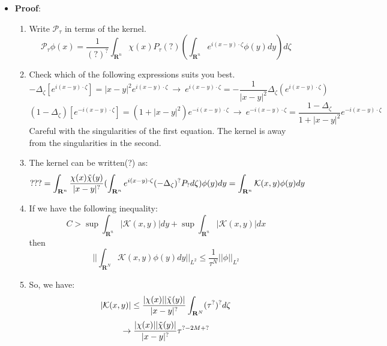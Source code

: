 \documentclass{article}
\begin{document}
\begin{itemize}
    \item \textbf{Proof}:
    \begin{enumerate}
        \item Write $\mathcal{P}_\tau$ in terms of the kernel.
        \begin{equation}
            \mathcal{P}_\tau \phi (x) = \frac{1}{(?)^?} \int_{\mathbf{R}^n} \chi (x) P_\tau (?)(\int_{\mathbf{R}^n}  e^{i (x -y)\cdot \zeta} \phi (y) dy) d\zeta
        \end{equation}

        \item Check which of the following expressions suits you best.
        \begin{equation}
            - \Delta_\zeta [e^{i(x -y) \cdot \zeta}] = |x - y|^2 e^{i(x -y) \cdot \zeta} \ \rightarrow \ e^{i(x -y) \cdot \zeta} = -\frac{1}{|x - y |^2} \Delta_\zeta (e^{i(x -y) \cdot \zeta})
        \end{equation}
        \begin{equation}
            (1 - \Delta_\zeta)[e^{-i(x -y) \cdot \zeta}] = (1+|x-y|^2) e^{-i(x -y) \cdot \zeta} \ \rightarrow \ e^{-i(x -y) \cdot \zeta} =  \frac{1  - \Delta_\zeta}{1 + |x - y|^2} e^{-i(x -y) \cdot \zeta}
        \end{equation}
        Careful with the singularities of the first equation. The kernel is away from the singularities in the second.

        \item The kernel can be written(?) as:
        \begin{equation}
            ??? = \int_{\mathbf{R}^n} \frac{\chi(x) \Tilde{\chi}(y)}{|x - y |^?} (\int_{\mathbf{R}^n} e^{i(x-y) \cdot \zeta} (- \Delta_\zeta)^? P_? d\zeta )\phi(y) dy = \int_{\mathbf{R}^n} \mathcal{K} (x, y) \phi (y) dy
        \end{equation}

        \item If we have the following inequality:
        \begin{equation}
            C > \sup \int_{\mathbf{R}^n}  | \mathcal{K} (x, y)| dy + \sup \int_{\mathbf{R}^n} | \mathcal{K} (x, y)| dx
        \end{equation}
        then
        \begin{equation}
            || \int_{\mathbf{R}^N} \mathcal{K} (x, y)\phi(y) dy||_{L^2} \leq \frac{1}{\tau^N} ||\phi||_{L^2}
        \end{equation}

        \item So, we have:
        \begin{equation}
            |\mathcal{K}(x,y)| \leq \frac{|\chi(x)||\Tilde{\chi}(y)|}{|x - y|^?} \int_{\mathbf{R}^N} (\tau^?)^? d\zeta
        \end{equation}
        \begin{equation}
            \rightarrow \frac{|\chi(x)||\Tilde{\chi}(y)|}{|x - y|^?} \tau^{? - 2M + ?}
        \end{equation}
    \end{enumerate}


\end{itemize}
\end{document}
